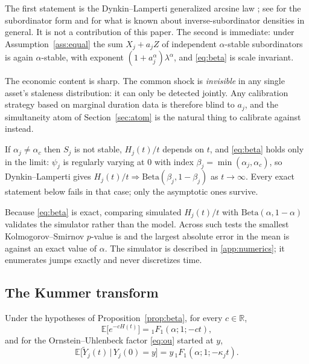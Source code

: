 \documentclass{ws-ijtaf}
\newcommand{\R}{\mathbb{R}}
\newcommand{\E}{\mathbb{E}}
\newcommand{\Bet}{\mathrm{Beta}}
\newcommand{\Fone}{{}_1F_1}
\newcommand{\wto}{\Rightarrow}
\begin{document}
The first statement is the Dynkin--Lamperti generalized arcsine law
\citep{lam58,dyn61}; see \citet[Sec.~3]{ber99} for the subordinator form and
\citet{asc24b} for what is known about inverse-subordinator densities in
general. It is
not a contribution of this paper. The second is immediate: under
Assumption~\ref{ass:equal} the sum $X_j+a_jZ$ of independent $\alpha$-stable
subordinators is again $\alpha$-stable, with exponent
$(1+a_j^{\alpha})\lambda^{\alpha}$, and \eqref{eq:beta} is scale invariant.

The economic content is sharp. The common shock is \emph{invisible} in any
single asset's staleness distribution: it can only be detected jointly. Any
calibration strategy based on marginal duration data is therefore blind to
$a_j$, and the simultaneity atom of Section~\ref{sec:atom} is the natural thing
to calibrate against instead.

\begin{remark}\label{rem:unequal}
If $\alpha_j\ne\alpha_c$ then $S_j$ is not stable, $H_j(t)/t$ depends on $t$,
and \eqref{eq:beta} holds only in the limit: $\psi_j$ is regularly varying at
$0$ with index $\beta_j=\min(\alpha_j,\alpha_c)$, so Dynkin--Lamperti gives
$H_j(t)/t \wto \Bet(\beta_j,1-\beta_j)$ as $t\to\infty$. Every exact statement
below fails in that case; only the asymptotic ones survive.
\end{remark}

\begin{remark}\label{rem:control}
Because \eqref{eq:beta} is exact, comparing simulated $H_j(t)/t$ with
$\Bet(\alpha,1-\alpha)$ validates the simulator rather than the model. Across
\nMarginalTests{} such tests the smallest Kolmogorov--Smirnov $p$-value is
\marginalMinKSp{} and the largest absolute error in the mean is
\marginalMaxMeanErr{} against an exact value of $\alpha$. The simulator is
described in \ref{app:numerics}; it enumerates jumps exactly and never
discretizes time.
\end{remark}

\subsection{The Kummer transform}

\begin{proposition}\label{prop:kummertransform}
Under the hypotheses of Proposition~\ref{prop:beta}, for every $c\in\R$,
\begin{equation}
\E\big[e^{-cH(t)}\big] = \Fone(\alpha;1;-ct),
\label{eq:kummertransform}
\end{equation}
and for the Ornstein--Uhlenbeck factor \eqref{eq:ou} started at $y$,
\begin{equation}
\E\big[\tilde Y_j(t)\,\big|\,Y_j(0)=y\big] = y\,\Fone(\alpha;1;-\kappa_j t).
\label{eq:oumean}
\end{equation}
\end{proposition}
\end{document}

